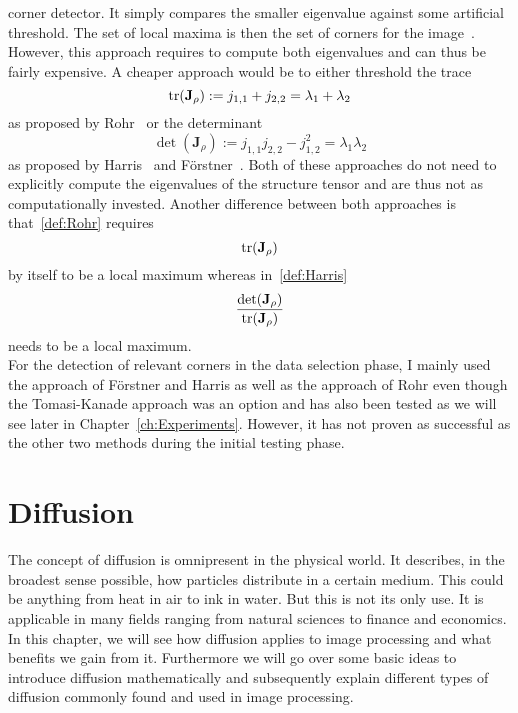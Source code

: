 corner detector. It simply compares the smaller eigenvalue against some artificial
threshold. The set of local maxima is then the set of corners for the image~\cite{shitomasi94}.
However, this approach requires to compute both eigenvalues and can thus be fairly expensive.
A cheaper approach would be to either threshold the trace 
\begin{equation}
    \operatorname{tr}(\mathbf{J}_\rho) := j_{1, 1} + j_{2,
    2} = \lambda_1 + \lambda_2\label{def:Rohr}
\end{equation} 
as proposed by Rohr~\cite{rohr91} or the determinant 
\begin{equation}
    \det(\mathbf{J}_\rho) := j_{1, 1}j_{2, 2} -
    j_{1, 2}^2 = \lambda_1\lambda_2\label{def:Harris}
\end{equation} 
as proposed by Harris~\cite{harris88} and Förstner~\cite{foerstner87}. Both of these approaches do 
not need to explicitly compute the eigenvalues of the structure tensor and are thus not as 
computationally invested.\newpage\noindent
Another difference between both approaches is that~\eqref{def:Rohr} 
requires 
\begin{equation}
    \operatorname{tr}(\mathbf{J}_\rho)
\end{equation}
by itself to be a local maximum whereas in~\eqref{def:Harris}
\begin{equation}
    \frac{\det(\mathbf{J}_\rho)}{\operatorname{tr}(\mathbf{J}_\rho)}
\end{equation} 
needs to be a local maximum.\\
For the detection of relevant corners in the data selection phase, I mainly used the approach of
Förstner and Harris as well as
the approach of Rohr even though the Tomasi-Kanade approach was an option and has also been
tested as we will see later in Chapter~\ref{ch:Experiments}. However, it has not proven as successful
as the other two methods during the initial testing phase.
\section{Diffusion}\label{sec:Diffusion}
The concept of diffusion is omnipresent in the physical world. It describes, in the broadest sense
possible, how particles distribute in a certain medium. This could be anything from heat in air to
ink in water. But this is not its only use. It is applicable in many fields ranging from
natural sciences to finance and economics. In this chapter, we will see how diffusion applies to
image processing and what benefits we gain from it. Furthermore we will go over some basic ideas to
introduce diffusion mathematically and subsequently explain different types of diffusion commonly
found and used in image processing.
